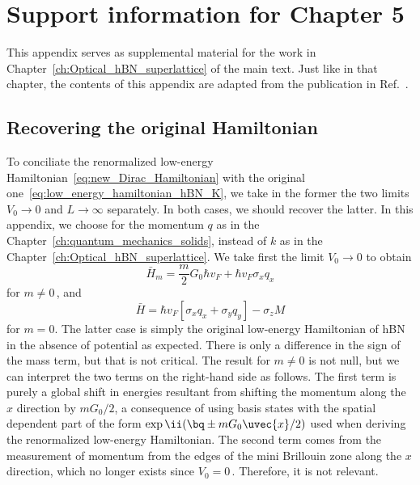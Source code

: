 
%

\chapter{Support information for Chapter 5}
\label{app:hBN_superlattice}

This appendix serves as supplemental material for the work in Chapter~\ref{ch:Optical_hBN_superlattice} of the main text.
Just like in that chapter, the contents of this appendix are adapted from the publication in Ref.~\cite{Ninhos_Tserkezis_Mortensen_Peres_2024}.


\section{Recovering the original Hamiltonian}
\label{sec:recover_original_hamiltonian}

To conciliate the renormalized low-energy Hamiltonian~\eqref{eq:new_Dirac_Hamiltonian} with the original one~\eqref{eq:low_energy_hamiltonian_hBN_K}, we take in the former the two limits $V_0 \to 0$ and $L \to \infty$ separately.
In both cases, we should recover the latter.
In this appendix, we choose for the momentum $q$ as in the Chapter~\ref{ch:quantum_mechanics_solids}, instead of $k$ as in the Chapter~\eqref{ch:Optical_hBN_superlattice}.
We take first the limit $V_0 \to 0$ to obtain
%
\begin{equation}
    \bar{H}_{m} = \frac{m}{2}G_{0}\hbar v_{F}+\hbar v_{F}\sigma_{x}q_{x}
\end{equation}
%
\noindent for $m \neq 0$\,, and
%
\begin{equation}
\bar{H} =\hbar v_{F}[\sigma_{x}q_{x}+\sigma_{y}q_{y}]-\sigma_{z}M
\end{equation}
%
\noindent for $m = 0$. 
The latter case is simply the original low-energy Hamiltonian of hBN in the absence of potential as expected.
There is only a difference in the sign of the mass term, but that is not critical.
The result for $m \neq 0$ is not null, but we can interpret the two terms on the right-hand side as follows.
The first term is purely a global shift in energies resultant from shifting the momentum along the $x$ direction by $m G_0/2$, a consequence of using basis states with the spatial dependent part of the form $\exp{\ii (\bq \pm m G_0 \uvec{x}/2)}$ used when deriving the renormalized low-energy Hamiltonian.
The second term comes from the measurement of momentum from the edges of the mini Brillouin zone along the $x$ direction, which no longer exists since $V_0 = 0$\,.
Therefore, it is not relevant.

